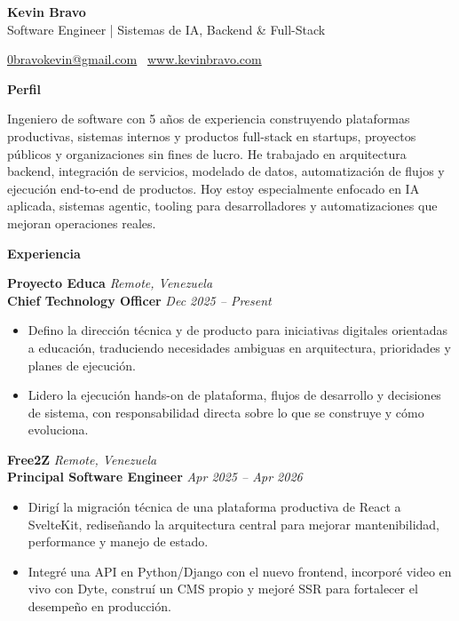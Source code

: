 \documentclass[11pt]{article}
\begin{document}
\begin{center}
    {\LARGE \textbf{Kevin Bravo}}\\
    Software Engineer | Sistemas de IA, Backend \& Full-Stack \\
    \hrulefill
\end{center}
\begin{center}
    \href{mailto:0bravokevin@gmail.com}{0bravokevin@gmail.com}
    \textbullet\ 
    \href{http://www.kevinbravo.com}{www.kevinbravo.com}
\end{center}
\vspace{4pt}
\begin{center}
    \textbf{Perfil}
\end{center}
\vspace{-4pt}
Ingeniero de software con 5 años de experiencia construyendo plataformas productivas, sistemas internos y productos full-stack en startups, proyectos públicos y organizaciones sin fines de lucro. He trabajado en arquitectura backend, integración de servicios, modelado de datos, automatización de flujos y ejecución end-to-end de productos. Hoy estoy especialmente enfocado en IA aplicada, sistemas agentic, tooling para desarrolladores y automatizaciones que mejoran operaciones reales.
\vspace{8pt}
\begin{center}
    \textbf{Experiencia}
\end{center}
\vspace{-4pt}
\textbf{Proyecto Educa} \hfill \textit{Remote, Venezuela} \\
\textbf{Chief Technology Officer} \hfill \textit{Dec 2025 -- Present}
\begin{itemize}
    \item Defino la dirección técnica y de producto para iniciativas digitales orientadas a educación, traduciendo necesidades ambiguas en arquitectura, prioridades y planes de ejecución.
    \item Lidero la ejecución hands-on de plataforma, flujos de desarrollo y decisiones de sistema, con responsabilidad directa sobre lo que se construye y cómo evoluciona.
\end{itemize}
\vspace{10pt}
\textbf{Free2Z} \hfill \textit{Remote, Venezuela} \\
\textbf{Principal Software Engineer} \hfill \textit{Apr 2025 -- Apr 2026}
\begin{itemize}
    \item Dirigí la migración técnica de una plataforma productiva de React a SvelteKit, rediseñando la arquitectura central para mejorar mantenibilidad, performance y manejo de estado.
    \item Integré una API en Python/Django con el nuevo frontend, incorporé video en vivo con Dyte, construí un CMS propio y mejoré SSR para fortalecer el desempeño en producción.
\end{itemize}
\end{document}
